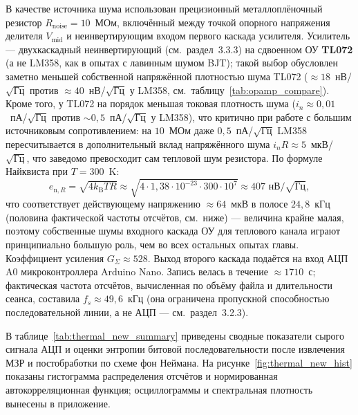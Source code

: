 
В качестве источника шума использован прецизионный металлоплёночный резистор
$R_\mathrm{noise}=10$~МОм, включённый между точкой опорного напряжения делителя
$V_\mathrm{mid}$ и неинвертирующим входом первого каскада усилителя. Усилитель ---
двухкаскадный неинвертирующий (см.~раздел~3.3.3) на сдвоенном ОУ \textbf{TL072}
(а не LM358, как в опытах с лавинным шумом BJT); такой выбор обусловлен заметно
меньшей собственной напряжённой плотностью шума TL072 (${\approx}18$~нВ/$\sqrt{\mathrm{Гц}}$
против ${\approx}40$~нВ/$\sqrt{\mathrm{Гц}}$ у LM358,
см.~таблицу~\ref{tab:opamp_compare}). Кроме того, у TL072 на порядок меньшая
токовая плотность шума ($i_n\!\approx\!0{,}01$~пА/$\sqrt{\mathrm{Гц}}$ против
$\sim\!0{,}5$~пА/$\sqrt{\mathrm{Гц}}$ у LM358), что критично при работе с
большим источниковым сопротивлением: на $10$~МОм даже $0{,}5$~пА/$\sqrt{\mathrm{Гц}}$
LM358 пересчитывается в дополнительный вклад напряжённого шума
$i_n R\approx 5$~мкВ/$\sqrt{\mathrm{Гц}}$, что заведомо превосходит сам тепловой
шум резистора. По формуле Найквиста при $T=300$~K:
\begin{equation}
  e_{\mathrm{n},R}=\sqrt{4k_\mathrm{B} T R}
  \approx \sqrt{4\cdot 1{,}38\cdot 10^{-23}\cdot 300\cdot 10^{7}}
  \approx 407\text{ нВ}/\sqrt{\mathrm{Гц}},
\end{equation}
что соответствует действующему напряжению ${\approx}64$~мкВ в полосе $24{,}8$~кГц
(половина фактической частоты отсчётов, см.~ниже) --- величина крайне малая, поэтому
собственные шумы входного каскада ОУ для теплового канала играют принципиально
большую роль, чем во всех остальных опытах главы. Коэффициент усиления
$G_\Sigma\approx 528$. Выход второго каскада подаётся на вход АЦП A0 микроконтроллера
Arduino Nano. Запись велась в течение ${\approx}1710$~с; фактическая частота отсчётов,
вычисленная по объёму файла и длительности сеанса, составила $f_s\approx 49{,}6$~кГц
(она ограничена пропускной способностью последовательной линии, а не АЦП ---
см.~раздел~3.2.3).


В таблице~\ref{tab:thermal_new_summary} приведены сводные показатели сырого сигнала
АЦП и оценки энтропии битовой последовательности после извлечения МЗР и постобработки
по схеме фон Неймана. На рисунке~\ref{fig:thermal_new_hist}
показаны гистограмма распределения отсчётов и нормированная автокорреляционная функция;
осциллограммы и спектральная плотность вынесены в приложение.


